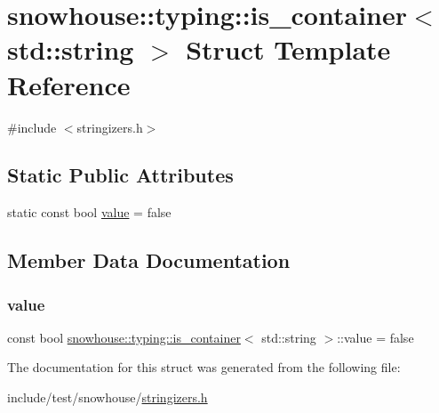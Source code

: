\hypertarget{structsnowhouse_1_1typing_1_1is__container_3_01std_1_1string_01_4}{}\section{snowhouse\+::typing\+::is\+\_\+container$<$ std\+::string $>$ Struct Template Reference}
\label{structsnowhouse_1_1typing_1_1is__container_3_01std_1_1string_01_4}


{\ttfamily \#include $<$stringizers.\+h$>$}

\subsection*{Static Public Attributes}
\begin{DoxyCompactItemize}
\item 
static const bool \mbox{\hyperlink{structsnowhouse_1_1typing_1_1is__container_3_01std_1_1string_01_4_a110672743afdb4f0546ff48cbf0848b4}{value}} = false
\end{DoxyCompactItemize}


\subsection{Member Data Documentation}
\mbox{\label{structsnowhouse_1_1typing_1_1is__container_3_01std_1_1string_01_4_a110672743afdb4f0546ff48cbf0848b4}} 
\subsubsection{\texorpdfstring{value}{value}}
{\footnotesize\ttfamily const bool \mbox{\hyperlink{structsnowhouse_1_1typing_1_1is__container}{snowhouse\+::typing\+::is\+\_\+container}}$<$ std\+::string $>$\+::value = false\hspace{0.3cm}{\ttfamily [static]}}



The documentation for this struct was generated from the following file\+:\begin{DoxyCompactItemize}
\item 
include/test/snowhouse/\mbox{\hyperlink{stringizers_8h}{stringizers.\+h}}\end{DoxyCompactItemize}
